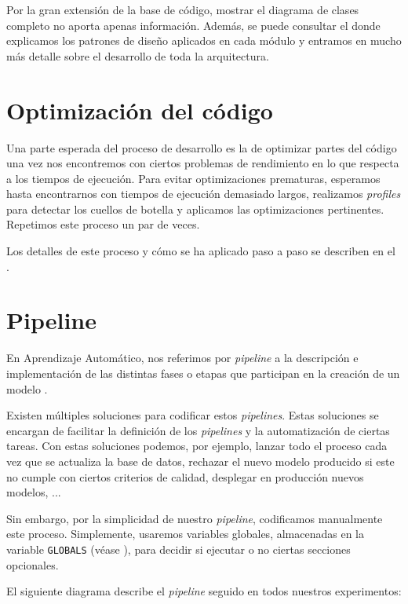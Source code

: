 Por la gran extensión de la base de código, mostrar el diagrama de clases completo no aporta apenas información. Además, se puede consultar el  donde explicamos los patrones de diseño aplicados en cada módulo y entramos en mucho más detalle sobre el desarrollo de toda la arquitectura.

\section{Optimización del código}

Una parte esperada del proceso de desarrollo es la de optimizar partes del código una vez nos encontremos con ciertos problemas de rendimiento en lo que respecta a los tiempos de ejecución. Para evitar optimizaciones prematuras, esperamos hasta encontrarnos con tiempos de ejecución demasiado largos, realizamos \textit{profiles} para detectar los cuellos de botella y aplicamos las optimizaciones pertinentes. Repetimos este proceso un par de veces.

Los detalles de este proceso y cómo se ha aplicado paso a paso se describen en el .

\section{Pipeline} \label{isec:pipeline}

En Aprendizaje Automático, nos referimos por \textit{pipeline} a la descripción e implementación de las distintas fases o etapas que participan en la creación de un modelo \cite{informatica:pipeline_web}.

Existen múltiples soluciones para codificar estos \textit{pipelines}. Estas soluciones se encargan de facilitar la definición de los \textit{pipelines} y la automatización de ciertas tareas. Con estas soluciones podemos, por ejemplo, lanzar todo el proceso cada vez que se actualiza la base de datos, rechazar el nuevo modelo producido si este no cumple con ciertos criterios de calidad, desplegar en producción nuevos modelos, ...

Sin embargo, por la simplicidad de nuestro \textit{pipeline}, codificamos manualmente este proceso. Simplemente, usaremos variables globales, almacenadas en la variable \lstinline{GLOBALS} (véase ), para decidir si ejecutar o no ciertas secciones opcionales.

El siguiente diagrama describe el \textit{pipeline} seguido en todos nuestros experimentos:

